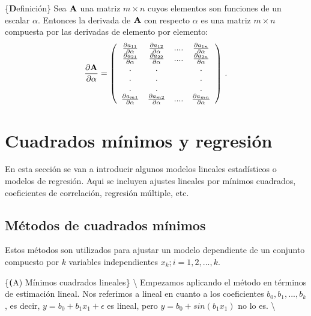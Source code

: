 \documentclass[
]{agujournal2019}
\begin{document}
\vspace{0.5cm}

\{\noindent \textbf Definición\} Sea \({\textbf A}\) una matriz
\(m\times n\) cuyos elementos son funciones de un escalar \(\alpha\).
Entonces la derivada de \({\textbf A}\) con respecto \(\alpha\) es una
matriz \(m\times n\) compuesta por las derivadas de elemento por
elemento:
\[\frac{\partial{\textbf A}}{\partial{\alpha}}=\left(\begin{array}{cccc}
  \frac{\partial{a_{11}}}{\partial{\alpha}} & \frac{\partial{a_{12}}}{\partial{\alpha}} & .... &
   \frac{\partial{a_{1n}}}{\partial{\alpha}}\\
  \frac{\partial{a_{21}}}{\partial{\alpha}} & \frac{\partial{a_{22}}}{\partial{\alpha}} & .... &
   \frac{\partial{a_{2n}}}{\partial{\alpha}}\\
    .    &   .    &      &   . \\
    .    &   .    &      &   . \\
    .    &   .    &      &   . \\
  \frac{\partial{a_{m1}}}{\partial{\alpha}} & \frac{\partial{a_{m2}}}{\partial{\alpha}} & .... &
   \frac{\partial{a_{mn}}}{\partial{\alpha}}\\
\end{array}
  \right)
\,.\]

\hypertarget{cuadrados-muxednimos-y-regresiuxf3n}{%
\section{Cuadrados mínimos y
regresión}\label{cuadrados-muxednimos-y-regresiuxf3n}}

\noindent En esta sección se van a introducir algunos modelos lineales
estadísticos o modelos de regresión. Aqui se incluyen ajustes lineales
por mínimos cuadrados, coeficientes de correlación, regresión múltiple,
etc.

\hypertarget{muxe9todos-de-cuadrados-muxednimos}{%
\subsection{Métodos de cuadrados
mínimos}\label{muxe9todos-de-cuadrados-muxednimos}}

\noindent Estos métodos son utilizados para ajustar un modelo
dependiente de un conjunto compuesto por \(k\) variables independientes
\(x_k;i=1,2,...,k\).

\vspace{0.5cm}

\{\noindent \textbf (A) \large Mínimos cuadrados lineales\}
\textbackslash{} Empezamos aplicando el método en términos de estimación
lineal. Nos referimos a lineal en cuanto a los coeficientes
\(b_0, b_1,...,b_k\), es decir, \(y=b_0 + b_1x_1 + \epsilon\) es lineal,
pero \(y=b_0+sin(b_1x_1)\) no lo es. \textbackslash{}
\end{document}
